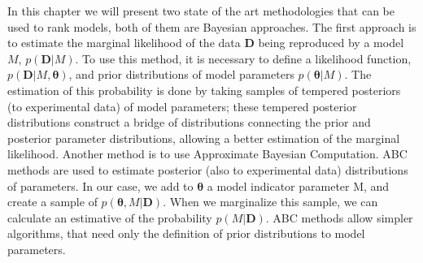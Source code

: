 
In this chapter we will present two state of the art methodologies that 
can be used to rank models, both of them are Bayesian approaches. The
first approach is to estimate the marginal likelihood of the data 
${\bm D}$ being reproduced by a model $M$, $p ({\bm D} | M)$. To use
this method, it is necessary to define a likelihood function, $p({\bm D}
| M, {\bm \theta})$, and prior distributions of model parameters $p({\bm
\theta} | M)$.
The estimation of this probability is done by taking samples of tempered 
posteriors (to experimental data) of model parameters; these tempered 
posterior distributions construct a bridge of distributions connecting 
the prior and posterior parameter distributions, allowing a better
estimation of the marginal likelihood. Another method is to use
Approximate Bayesian Computation. ABC methods are used to estimate
posterior (also to experimental data) distributions of parameters. In
our case, we add to ${\bm \theta}$ a model indicator parameter M, and
create a sample of $p({\bm \theta}, M | {\bm D})$. When we marginalize
this sample, we can calculate an  estimative of the probability $p (M |
{\bm D})$. ABC methods allow simpler algorithms, that need only the
definition of prior distributions to model parameters. 


